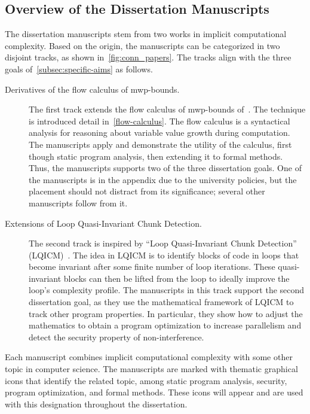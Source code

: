 \subsection{Overview of the Dissertation Manuscripts}
\label{subsec:conn-papers}

The dissertation manuscripts stem from two works in implicit computational complexity.
Based on the origin, the manuscripts can be categorized in two disjoint tracks, as shown in~\autoref{fig:conn_papers}.
The tracks align with the three goals of~\autoref{subsec:specific-aims} as follows.

\begin{description}
\item[Derivatives of the flow calculus of mwp-bounds.]
The first track extends the flow calculus of mwp-bounds of~\textcite{jones2009}.
The technique is introduced detail in~\autoref{flow-calculus}.
The flow calculus is a syntactical analysis for reasoning about variable value growth during computation.
The manuscripts apply and demonstrate the utility of the calculus, first though static program analysis, then extending it to formal methods.
Thus, the manuscripts supports two of the three dissertation goals.
One of the manuscripts is in the appendix due to the university policies, but the placement should not distract from its significance;
several other manuscripts follow from it.

\item[Extensions of Loop Quasi-Invariant Chunk Detection.]
The second track is inspired by \enquote{Loop Quasi-Invariant Chunk Detection} (LQICM)~\cite{moyen20172}.
The idea in LQICM is to identify blocks of code in loops that become invariant after some finite number of loop iterations.
These quasi-invariant blocks can then be lifted from the loop to ideally improve the loop's complexity profile.
The manuscripts in this track support the second dissertation goal,
as they use the mathematical framework of LQICM to track other program properties.
In particular, they show how to adjust the mathematics to obtain a program optimization to increase parallelism and detect the security property of non-interference.
\end{description}

Each manuscript combines implicit computational complexity with some other topic in computer science.
The manuscripts are marked with thematic graphical icons that identify the related topic, among static program analysis, security, program optimization, and formal methods.
These icons will appear and are used with this designation throughout the dissertation.


